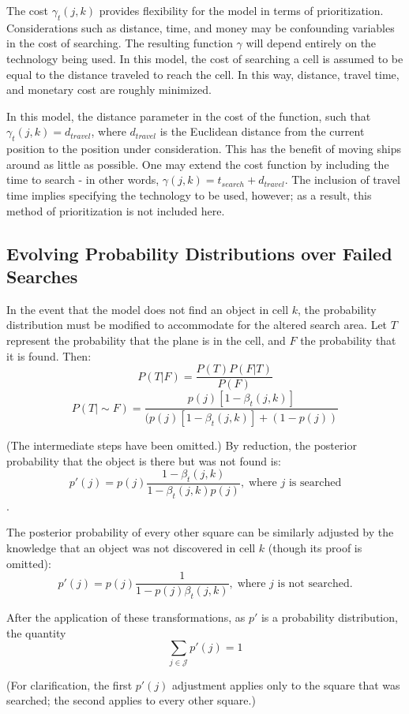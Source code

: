 \documentclass[a4paper]{article}
\begin{document}
The cost $\gamma_t(j,k)$ provides flexibility for the model in terms of prioritization. Considerations such as distance, time, and money may be confounding variables in the cost of searching. The resulting function $\gamma$ will depend entirely on the technology being used. In this model, the cost of searching a cell is assumed to be equal to the distance traveled to reach the cell. In this way, distance, travel time, and monetary cost are roughly minimized.

In this model, the distance parameter in the cost of the function, such that $\gamma_t(j,k)=d_{travel}$, where $d_{travel}$ is the Euclidean distance from the current position to the position under consideration. This has the benefit of moving ships around as little as possible. One may extend the cost function by including the time to search - in other words, $\gamma(j,k)=t_{search}+d_{travel}$. The inclusion of travel time implies specifying the technology to be used, however; as a result, this method of prioritization is not included here.  

\subsection{Evolving Probability Distributions over Failed Searches}

In the event that the model does not find an object in cell $k$, the probability distribution must be modified to accommodate for the altered search area. Let $T$ represent the probability that the plane is in the cell, and $F$ the probability that it is found. Then: 
$$P(T|F)=\frac{P(T)P(F|T)}{P(F)}$$ 
$$P(T|\sim F)=\frac{p(j)[1-\beta_t(j,k)]}{(p(j)[1-\beta_t(j,k)]+(1-p(j))}$$

(The intermediate steps have been omitted.) By reduction, the posterior probability that the object is there but was not found is: $$p'(j)=p(j)\frac{1-\beta_t(j,k)}{1-\beta_t(j,k)p(j)},\;\mbox{where }j\mbox{ is searched}$$.

The posterior probability of every other square can be similarly adjusted by the knowledge that an object was not discovered in cell $k$ (though its proof is omitted): $$p'(j)=p(j)\frac{1}{1-p(j)\beta_t(j,k)},\;\mbox{where }j\mbox{ is not searched.}$$

After the application of these transformations, as $p'$ is a probability distribution, the quantity $$\sum_{j\in\mathcal{J}}p'(j) = 1$$

(For clarification, the first $p'(j)$ adjustment applies only to the square that was searched; the second applies to every other square.)
\end{document}
